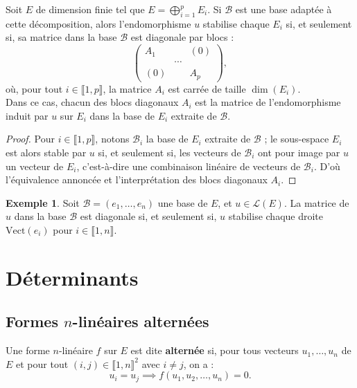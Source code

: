 \documentclass[french]{article}
\newcommand{\Vect}{\text{Vect}}
\theoremstyle{plain}
\theoremstyle{definition}
\newtheorem*{ex}{Exemple}
\theoremstyle{remark}
\begin{document}
\begin{prop}%
	Soit $E$ de dimension finie tel que $E=\displaystyle\bigoplus_{i=1}^pE_i$. Si $\mathcal{B}$ est une base adaptée à cette décomposition, alors l'endomorphisme $u$ stabilise chaque $E_i$ si, et seulement si, sa matrice dans la base $\mathcal{B}$ est diagonale par blocs :
	$$\begin{pmatrix}
		A_1&&(0)\\
		&\cdots&\\
		(0)&&A_p
	\end{pmatrix},$$ où, pour tout $i\in\llbracket1,p\rrbracket$, la matrice $A_i$ est carrée de taille $\dim(E_i)$.\\
	Dans ce cas, chacun des blocs diagonaux $A_i$ est la matrice de l'endomorphisme induit par $u$ sur $E_i$ dans la base de $E_i$ extraite de $\mathcal{B}$.
\end{prop}
\begin{proof}
	Pour $i\in\llbracket1,p\rrbracket$, notons $\mathcal{B}_i$ la base de $E_i$ extraite de $\mathcal{B}$ ; le sous-espace $E_i$ est alors stable par $u$ si, et seulement si, les vecteurs de $\mathcal{B}_i$ ont pour image par $u$ un vecteur de $E_i$, c'est-à-dire une combinaison linéaire de vecteurs de $\mathcal{B}_i$. D'où l'équivalence annoncée et l'interprétation des blocs diagonaux $A_i$.
\end{proof}

\begin{ex}
	Soit $\mathcal{B}=(e_1,\ldots,e_n)$ une base de $E$, et $u\in\mathcal{L}(E)$. La matrice de $u$ dans la base $\mathcal{B}$ est diagonale si, et seulement si, $u$ stabilise chaque droite $\Vect(e_i)$ pour $i\in\llbracket1,n\rrbracket$.
\end{ex}

\section{Déterminants}

\subsection{Formes $n$-linéaires alternées}

\begin{dfn}
	Une forme $n$-linéaire $f$ sur $E$ est dite \textbf{alternée} si, pour tous vecteurs $u_1,\ldots,u_n$ de $E$ et pour tout $(i,j)\in\llbracket1,n\rrbracket^2$ avec $i\ne j$, on a :
	$$u_i=u_j\implies f(u_1,u_2,\ldots,u_n)=0.$$
\end{dfn}
\end{document}
